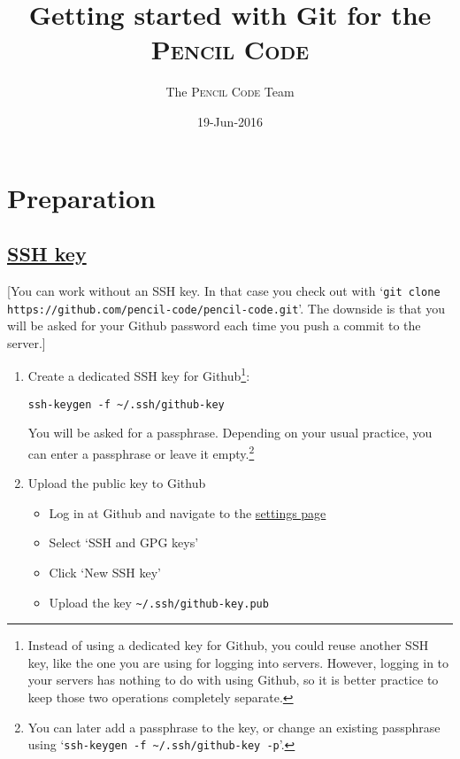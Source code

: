 \documentclass[12pt,pdftex]{article}
\author{The \textsc{Pencil Code} Team}
\date{19-Jun-2016}
\title{Getting started with Git for the \textsc{Pencil Code}}
\begin{document}
\lstset{%
  frame=single,%
  basicstyle=\ttfamily\footnotesize,%
  language=sh,%
  label= ,%
  caption= ,%
  captionpos=b,%
  numbers=none%
}

\maketitle
\thispagestyle{empty}


\section{Preparation}


\subsection{%
  \href{https://help.github.com/articles/generating-an-ssh-key/%
  }{%
  SSH key%
}}

[You can work without an SSH key.
In that case you check out with
‘\texttt{git clone https://github.com/pencil-code/pencil-code.git}’.
The downside is that you will be asked for your Github password each
time you push a commit to the server.]

\begin{enumerate}
\item Create a dedicated SSH key for Github\footnote{
    Instead of using a dedicated key for Github, you could reuse another
    SSH key, like the one you are using for logging into servers.
    However, logging in to your servers has nothing to do with using Github, so
    it is better practice to keep those two operations completely
    separate.%
}:
\begin{lstlisting}
ssh-keygen -f ~/.ssh/github-key
\end{lstlisting}

You will be asked for a passphrase.
Depending on your usual practice, you can enter a passphrase or leave it
empty.\footnote{%
  You can later add a passphrase to the key, or change an existing
  passphrase using
  ‘\texttt{ssh-keygen -f \textasciitilde{}/.ssh/github-key -p}’.%
}

\item Upload the public key to Github 
  \begin{itemize}
  \item Log in at Github and navigate to the
    \href{https://github.com/settings/profile}{settings page}
  \item Select ‘SSH and GPG keys’
  \item Click ‘New SSH key’
  \item Upload the key \texttt{\textasciitilde{}/.ssh/github-key.pub}
  \end{itemize}
\end{enumerate}
\end{document}
